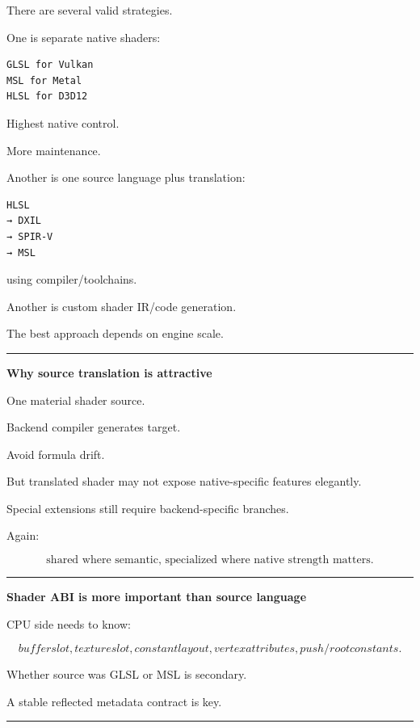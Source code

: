 There are several valid strategies.

One is separate native shaders:

\begin{verbatim}
GLSL for Vulkan
MSL for Metal
HLSL for D3D12
\end{verbatim}

Highest native control.

More maintenance.

Another is one source language plus translation:

\begin{verbatim}
HLSL
→ DXIL
→ SPIR-V
→ MSL
\end{verbatim}

using compiler/toolchains.

Another is custom shader IR/code generation.

The best approach depends on engine scale.

\begin{center}\rule{0.5\linewidth}{0.5pt}\end{center}

\textbf{Why source translation is attractive}

One material shader source.

Backend compiler generates target.

Avoid formula drift.

But translated shader may not expose native-specific features elegantly.

Special extensions still require backend-specific branches.

Again:

\[
\boxed{
\text{shared where semantic, specialized where native strength matters}.
}
\]

\begin{center}\rule{0.5\linewidth}{0.5pt}\end{center}

\textbf{Shader ABI is more important than source language}

CPU side needs to know:

\[
buffer slot,
texture slot,
constant layout,
vertex attributes,
push/root constants.
\]

Whether source was GLSL or MSL is secondary.

A stable reflected metadata contract is key.

\begin{center}\rule{0.5\linewidth}{0.5pt}\end{center}

